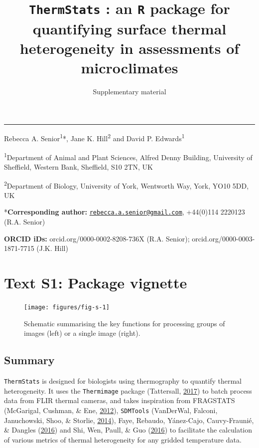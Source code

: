\documentclass[12pt,british,a4paper,]{article}
\title{\texttt{ThermStats} : an \texttt{R} package for quantifying surface thermal heterogeneity in assessments of microclimates}
\subtitle{Supplementary material}
\author{}
\date{}
\begin{document}
\maketitle

\begin{center}\rule{0.5\linewidth}{\linethickness}\end{center}

Rebecca A. Senior\textsuperscript{1}*, Jane K. Hill\textsuperscript{2} and David P. Edwards\textsuperscript{1}

\textsuperscript{1}Department of Animal and Plant Sciences, Alfred Denny Building, University of Sheffield, Western Bank, Sheffield, S10 2TN, UK

\textsuperscript{2}Department of Biology, University of York, Wentworth Way, York, YO10 5DD, UK

*\textbf{Corresponding author:} \href{mailto:rebecca.a.senior@gmail.com}{\nolinkurl{rebecca.a.senior@gmail.com}}, +44(0)114 2220123 (R.A. Senior)

\textbf{ORCID iDs:} orcid.org/0000-0002-8208-736X (R.A. Senior); orcid.org/0000-0003-1871-7715 (J.K. Hill)

\pagebreak
\raggedright
\setcounter{tocdepth}{2}
\tableofcontents
\pagebreak

\hypertarget{text-s1-package-vignette}{%
\section{Text S1: Package vignette}\label{text-s1-package-vignette}}



\begin{figure}[H]

{\centering \texttt{[image: figures/fig-s-1]} 

}

\caption{Schematic summarising the key functions for processing groups of images (left) or a single image (right).}\label{fig:fig-B-2}
\end{figure}

\hypertarget{summary}{%
\subsection{Summary}\label{summary}}

\texttt{ThermStats} is designed for biologists using thermography to quantify thermal heterogeneity. It uses the \texttt{Thermimage} package (Tattersall, \protect\hyperlink{ref-tattersall_thermimage:_2017}{2017}) to batch process data from FLIR thermal cameras, and takes inspiration from FRAGSTATS (McGarigal, Cushman, \& Ene, \protect\hyperlink{ref-fragstats_2012}{2012}), \texttt{SDMTools} (VanDerWal, Falconi, Januchowski, Shoo, \& Storlie, \protect\hyperlink{ref-sdmtools_2014}{2014}), Faye, Rebaudo, Yánez-Cajo, Cauvy-Fraunié, \& Dangles (\protect\hyperlink{ref-faye_toolbox_2016}{2016}) and Shi, Wen, Paull, \& Guo (\protect\hyperlink{ref-shi_framework_2016}{2016}) to facilitate the calculation of various metrics of thermal heterogeneity for any gridded temperature data.
\end{document}
